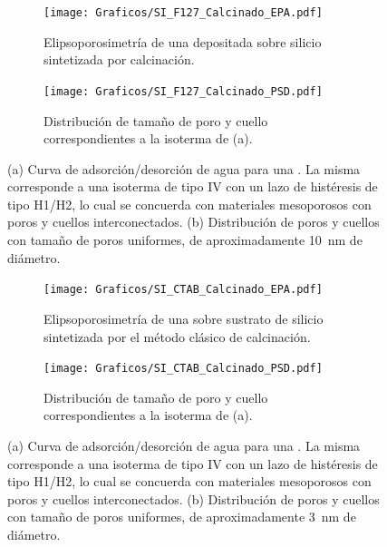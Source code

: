 		     	  	\begin{figure}[!ht]
		     	  		\begin{subfigure}[t]{0.495\textwidth}
		     	  		\texttt{[image: Graficos/SI\_F127\_Calcinado\_EPA.pdf]}
						\caption{Elipsoporosimetría de una \pdmF\space depositada sobre silicio sintetizada por calcinación.}
						\label{fig:F127_EPA}
						\end{subfigure}
						\begin{subfigure}[t]{0.495\textwidth}
		     	  		\texttt{[image: Graficos/SI\_F127\_Calcinado\_PSD.pdf]}
						\caption{Distribución de tamaño de poro y cuello correspondientes a la isoterma de (a).}
						\label{fig:F127_PSD}
						\end{subfigure}
						\caption[Elipsoporosimetría para sistemas \pdmF.]{(a) Curva de adsorción/desorción de agua para una \pdmF\space. La misma corresponde a una isoterma de tipo IV con un lazo de histéresis de tipo H1/H2, lo cual se concuerda con materiales mesoporosos con poros y cuellos interconectados. (b) Distribución de poros y cuellos con tamaño de poros uniformes, de aproximadamente \SI{10}{\nm} de diámetro.}
						\end{figure}
					\begin{figure}[!ht]
		     	  		\begin{subfigure}[t]{0.495\textwidth}
		     	  		\texttt{[image: Graficos/SI\_CTAB\_Calcinado\_EPA.pdf]}
						\caption{Elipsoporosimetría de una \pdmF\space sobre sustrato de silicio sintetizada por el método clásico de calcinación.}
						\label{fig:CTAB_EPA}
						\end{subfigure}
						\begin{subfigure}[t]{0.495\textwidth}
		     	  		\texttt{[image: Graficos/SI\_CTAB\_Calcinado\_PSD.pdf]}
						\caption{Distribución de tamaño de poro y cuello correspondientes a la isoterma de (a).}
						\label{fig:CTAB_PSD}
						\end{subfigure}
						\caption[Elipsoporosimetría para sistemas \pdmC.]{(a) Curva de adsorción/desorción de agua para una \pdmC\space . La misma corresponde a una isoterma de tipo IV con un lazo de histéresis de tipo H1/H2, lo cual se concuerda con materiales mesoporosos con poros y cuellos interconectados. (b) Distribución de poros y cuellos con tamaño de poros uniformes, de aproximadamente \SI{3}{\nm} de diámetro.}
						\end{figure}	
		
